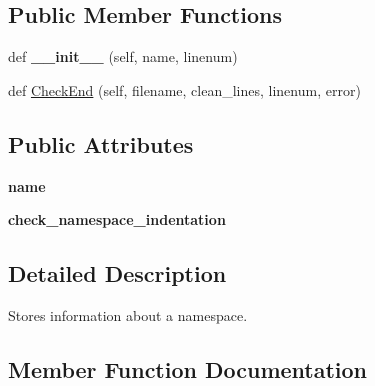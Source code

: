 \subsection*{Public Member Functions}
\begin{DoxyCompactItemize}
\item 
def {\bfseries \+\_\+\+\_\+init\+\_\+\+\_\+} (self, name, linenum)\hypertarget{classcpplint_1_1__NamespaceInfo_a4425c93bd90fbf869dc31c87302f5bb0}{}\label{classcpplint_1_1__NamespaceInfo_a4425c93bd90fbf869dc31c87302f5bb0}

\item 
def \hyperlink{classcpplint_1_1__NamespaceInfo_a9d3abaeed0353942ca689eeeb2f2924b}{Check\+End} (self, filename, clean\+\_\+lines, linenum, error)
\end{DoxyCompactItemize}
\subsection*{Public Attributes}
\begin{DoxyCompactItemize}
\item 
{\bfseries name}\hypertarget{classcpplint_1_1__NamespaceInfo_a6b518dae822e4e440405654e83dc86a1}{}\label{classcpplint_1_1__NamespaceInfo_a6b518dae822e4e440405654e83dc86a1}

\item 
{\bfseries check\+\_\+namespace\+\_\+indentation}\hypertarget{classcpplint_1_1__NamespaceInfo_ae0b0b6ffafd3336a93cddca1078df268}{}\label{classcpplint_1_1__NamespaceInfo_ae0b0b6ffafd3336a93cddca1078df268}

\end{DoxyCompactItemize}


\subsection{Detailed Description}
\begin{DoxyVerb}Stores information about a namespace.\end{DoxyVerb}
 

\subsection{Member Function Documentation}
